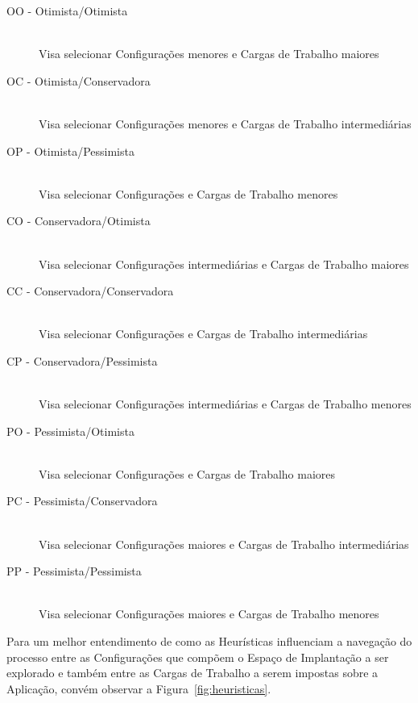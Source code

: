 \begin{samepage}
\begin{description}
  \item[OO - Otimista/Otimista] \hfill \\ Visa selecionar Configurações menores e Cargas de Trabalho maiores
  \item[OC - Otimista/Conservadora] \hfill \\ Visa selecionar Configurações menores e Cargas de Trabalho intermediárias
  \item[OP - Otimista/Pessimista] \hfill \\ Visa selecionar Configurações e Cargas de Trabalho menores
  \item[CO - Conservadora/Otimista] \hfill \\ Visa selecionar Configurações intermediárias e Cargas de Trabalho maiores
  \item[CC - Conservadora/Conservadora] \hfill \\ Visa selecionar Configurações e Cargas de Trabalho intermediárias
  \item[CP - Conservadora/Pessimista] \hfill \\ Visa selecionar Configurações intermediárias e Cargas de Trabalho menores
  \item[PO - Pessimista/Otimista] \hfill \\ Visa selecionar Configurações e Cargas de Trabalho maiores
  \item[PC - Pessimista/Conservadora] \hfill \\ Visa selecionar Configurações maiores e Cargas de Trabalho intermediárias
  \item[PP - Pessimista/Pessimista] \hfill \\ Visa selecionar Configurações maiores e Cargas de Trabalho menores
\end{description}
\end{samepage}

Para um melhor entendimento de como as Heurísticas influenciam a navegação do 
processo entre as Configurações que compõem o Espaço de Implantação a ser explorado
e também entre as Cargas de Trabalho a serem impostas sobre a Aplicação, convém
observar a Figura~\ref{fig:heuristicas}.

